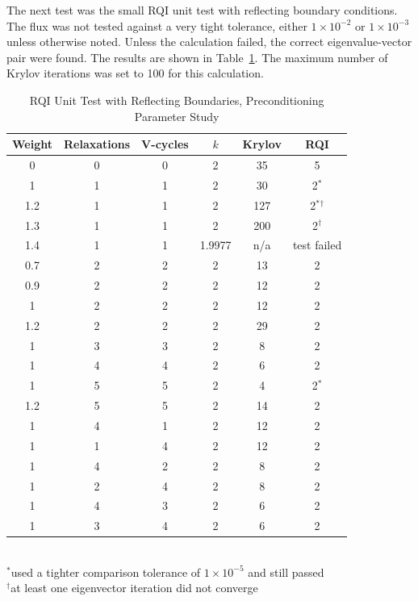 The next test was the small RQI unit test with reflecting boundary conditions. The flux was not tested against a very tight tolerance, either $1 \times 10^{-2}$ or $1 \times 10^{-3}$ unless otherwise noted. Unless the calculation failed, the correct eigenvalue-vector pair were found. The results are shown in Table~\ref{table:RQIUnitTestRefl}. The maximum number of Krylov iterations was set to 100 for this calculation.
%
\begin{table}[!h]
\caption{RQI Unit Test with Reflecting Boundaries, Preconditioning Parameter Study}
\begin{center}
\begin{tabular}{| c | c | c | c | c | c |}
\hline
Weight & Relaxations & V-cycles & $k$ & Krylov & RQI \\[0.5ex]
\hline
0    & 0 & 0 & 2 & 35   & 5 \\
1    & 1 & 1 & 2 & 30   & 2$^{*}$ \\
1.2 & 1 & 1 & 2 & 127 & 2$^{*}$$^{\dag}$ \\
1.3 & 1 & 1 & 2 & 200 & 2$^{\dag}$ \\
1.4 & 1 & 1 & 1.9977  & n/a & test failed \\
\hline
0.7 & 2 & 2 & 2 & 13   & 2 \\
0.9 & 2 & 2 & 2 & 12   & 2 \\
1    & 2 & 2 & 2 & 12   & 2 \\
1.2 & 2 & 2 & 2 & 29   & 2 \\
\hline
1    & 3 & 3 & 2 & 8     & 2 \\
1    & 4 & 4 & 2 & 6     & 2 \\
1    & 5 & 5 & 2 & 4     & 2$^{*}$ \\
1.2 & 5 & 5 & 2 & 14   & 2 \\
\hline
1    & 4 & 1 & 2 & 12   & 2 \\
1    & 1 & 4 & 2 & 12   & 2 \\
1    & 4 & 2 & 2 & 8     & 2 \\
1    & 2 & 4 & 2 & 8     & 2 \\
1    & 4 & 3 & 2 & 6     & 2 \\
1    & 3 & 4 & 2 & 6     & 2 \\
\hline 
\end{tabular}\\
$^{*}$used a tighter comparison tolerance of $1 \times 10^{-5}$ and still passed\\
$^{\dag}$at least one eigenvector iteration did not converge
\end{center}
\label{table:RQIUnitTestRefl}
\end{table}

